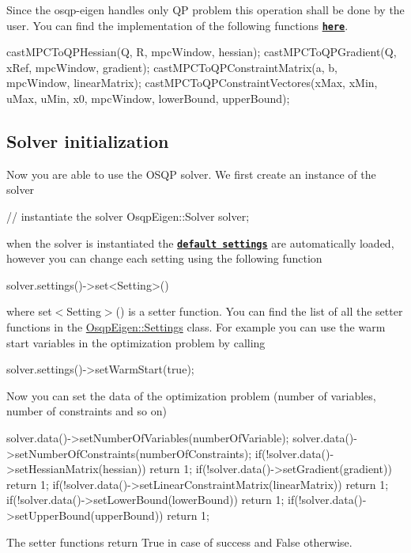 Since the osqp-\/eigen handles only QP problem this operation shall be done by the user. You can find the implementation of the following functions \href{https://github.com/GiulioRomualdi/osqp-eigen/blob/master/example/src/MPCExample.cpp#L71-L182}{\tt {\bfseries here}}. 
\begin{DoxyCode}
castMPCToQPHessian(Q, R, mpcWindow, hessian);
castMPCToQPGradient(Q, xRef, mpcWindow, gradient);
castMPCToQPConstraintMatrix(a, b, mpcWindow, linearMatrix);
castMPCToQPConstraintVectores(xMax, xMin, uMax, uMin, x0, mpcWindow, lowerBound, upperBound);
\end{DoxyCode}
\hypertarget{index_OSQP_init}{}\subsection{Solver initialization}\label{index_OSQP_init}
Now you are able to use the O\+S\+QP solver. We first create an instance of the solver 
\begin{DoxyCode}
\textcolor{comment}{// instantiate the solver}
OsqpEigen::Solver solver;
\end{DoxyCode}
 when the solver is instantiated the \href{http://osqp.readthedocs.io/en/latest/interfaces/solver_settings.html}{\tt {\bfseries default settings}} are automatically loaded, however you can change each setting using the following function 
\begin{DoxyCode}
solver.settings()->set<Setting>()
\end{DoxyCode}
 where {\ttfamily set$<$\+Setting$>$()} is a setter function. You can find the list of all the setter functions in the {\ttfamily \mbox{\hyperlink{classOsqpEigen_1_1Settings}{Osqp\+Eigen\+::\+Settings}}} class. For example you can use the warm start variables in the optimization problem by calling 
\begin{DoxyCode}
solver.settings()->setWarmStart(\textcolor{keyword}{true});
\end{DoxyCode}


Now you can set the data of the optimization problem (number of variables, number of constraints and so on) 
\begin{DoxyCode}
solver.data()->setNumberOfVariables(numberOfVariable);
solver.data()->setNumberOfConstraints(numberOfConstraints);
\textcolor{keywordflow}{if}(!solver.data()->setHessianMatrix(hessian)) \textcolor{keywordflow}{return} 1;
\textcolor{keywordflow}{if}(!solver.data()->setGradient(gradient)) \textcolor{keywordflow}{return} 1;
\textcolor{keywordflow}{if}(!solver.data()->setLinearConstraintMatrix(linearMatrix)) \textcolor{keywordflow}{return} 1;
\textcolor{keywordflow}{if}(!solver.data()->setLowerBound(lowerBound)) \textcolor{keywordflow}{return} 1;
\textcolor{keywordflow}{if}(!solver.data()->setUpperBound(upperBound)) \textcolor{keywordflow}{return} 1;
\end{DoxyCode}
 The setter functions return {\ttfamily True} in case of success and {\ttfamily False} otherwise.

